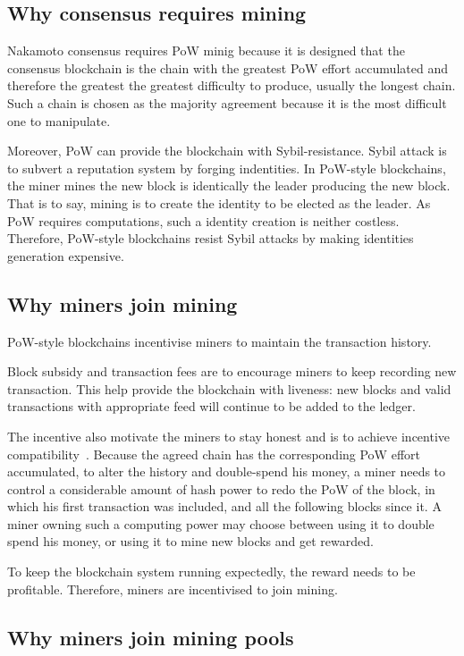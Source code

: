 \subsection{Why consensus requires mining}

Nakamoto consensus requires PoW minig because it is designed that the consensus blockchain is the chain with the greatest PoW effort accumulated and therefore the greatest the greatest difficulty to produce, usually the longest chain.
Such a chain is chosen as the majority agreement because it is the most difficult one to manipulate.

Moreover, PoW can provide the blockchain with Sybil-resistance.
Sybil attack is to subvert a reputation system by forging indentities.
In PoW-style blockchains, the miner mines the new block is identically the leader producing the new block.
That is to say, mining is to create the identity to be elected as the leader.
As PoW requires computations, such a identity creation is neither costless.
Therefore, PoW-style blockchains resist Sybil attacks by making identities generation expensive.

\subsection{Why miners join mining}

PoW-style blockchains incentivise miners to maintain the transaction history.

Block subsidy and transaction fees are to encourage miners to keep recording new transaction.
This help provide the blockchain with liveness: new blocks and valid transactions with appropriate feed will continue to be added to the ledger.

The incentive also motivate the miners to stay honest and is to achieve incentive compatibility~\cite{}.
Because the agreed chain has the corresponding PoW effort accumulated, to alter the history and double-spend his money, a miner needs to control a considerable amount of hash power to redo the PoW of the block, in which his first transaction was included, and all the following blocks since it.
A miner owning such a computing power may choose between using it to double spend his money, or using it to mine new blocks and get rewarded. 

To keep the blockchain system running expectedly, the reward needs to be profitable.
Therefore, miners are incentivised to join mining.

\subsection{Why miners join mining pools}

